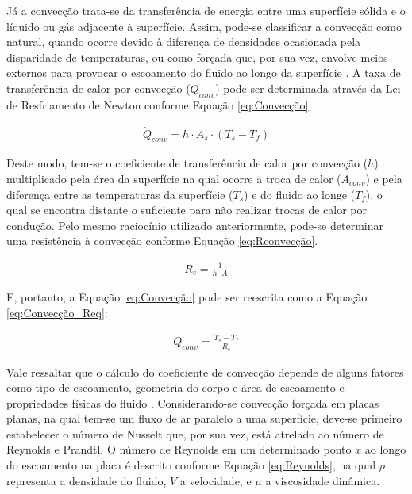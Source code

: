 \documentclass[acronym,symbols,table]{fei}
\begin{document}
Já a convecção trata-se da transferência de energia entre uma superfície sólida e o líquido ou gás adjacente à superfície. Assim, pode-se classificar a convecção como natural, quando ocorre devido à diferença de densidades ocasionada pela disparidade de temperaturas, ou como forçada que, por sua vez, envolve meios externos para provocar o escoamento do fluido ao longo da superfície \cite{kreith1999mechanical}. A taxa de transferência de calor por convecção ($\dot{Q}_{conv}$) pode ser determinada através da Lei de Resfriamento de Newton conforme Equação \ref{eq:Convecção}.

\begin{equation} \label{eq:Convecção}
\begin{aligned}
    \dot{Q}_{conv}=h \cdot A_{s} \cdot (T_{s}-T_{f})
\end{aligned}
\end{equation}

Deste modo, tem-se o coeficiente de transferência de calor por convecção ($h$) multiplicado pela área da superfície na qual ocorre a troca de calor ($A_{conv}$) e pela diferença entre as temperaturas da superfície ($T_{s}$) e do fluido ao longe ($T_{f}$), o qual se encontra distante o suficiente para não realizar trocas de calor por condução. Pelo mesmo raciocínio utilizado anteriormente, pode-se determinar uma resistência à convecção conforme Equação \ref{eq:Rconvecção}.

\begin{equation} \label{eq:Rconvecção}
\begin{aligned}
    {R}_{c}=\frac{1}{h \cdot A}
\end{aligned}
\end{equation}

E, portanto, a Equação \ref{eq:Convecção} pode ser reescrita como a Equação \ref{eq:Convecção_Req}:

\begin{equation} \label{eq:Convecção_Req}
\begin{aligned}
    {Q}_{conv}=\frac{T_{s}-T_{f}}{{R}_{c}}
\end{aligned}
\end{equation}

Vale ressaltar que o cálculo do coeficiente de convecção depende de alguns fatores como tipo de escoamento, geometria do corpo e área de escoamento e propriedades físicas do fluido \cite{ozicsik1993heat}. Considerando-se convecção forçada em placas planas, na qual tem-se um fluxo de ar paralelo a uma superfície, deve-se primeiro estabelecer o número de Nusselt que, por sua vez, está atrelado ao número de Reynolds e Prandtl. O número de Reynolds em um determinado ponto $x$ ao longo do escoamento na placa é descrito conforme Equação \ref{eq:Reynolds}, na qual $\rho$ representa a densidade do fluido, $V$ a velocidade, e $\mu$ a viscosidade dinâmica.
\end{document}
